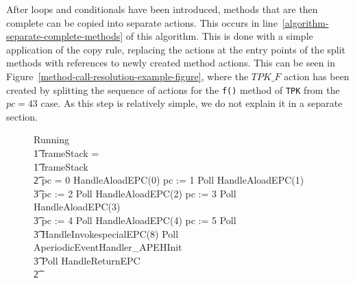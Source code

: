 After loops and conditionals have been introduced, methods that are
then complete can be copied into separate actions.
This occurs in line~\ref{algorithm-separate-complete-methods} of this
algorithm.
This is done with a simple application of the copy rule, replacing the
actions at the entry points of the split methods with references to
newly created method actions.
This can be seen in
Figure~\ref{method-call-resolution-example-figure}, where the $TPK\_F$
action has been created by splitting the sequence of actions for the
\texttt{f()} method of \texttt{TPK} from the $pc = 43$ case.
As this step is relatively simple, we do not explain it in a separate
section.
\begin{figure}[t]
  \setlength{\zedindent}{0cm}
  \setlength{\zedtab}{0.3cm}
  \setlength{\zedleftsep}{0cm}
  \begin{circus}
    Running \circdef \\
    \t1 \circif frameStack = \emptyset \circthen \Skip \\
    \t1 {} \circelse frameStack \neq \emptyset \circthen {} \\
    \t2 {} \circif pc = 0 \circthen HandleAloadEPC(0) \circseq pc := 1 \circseq Poll \circseq HandleAloadEPC(1) \circseq \\
    \t3 pc := 2 \circseq Poll \circseq HandleAloadEPC(2) \circseq pc := 3 \circseq Poll \circseq HandleAloadEPC(3) \circseq \\
    \t3 pc := 4 \circseq Poll \circseq HandleAloadEPC(4) \circseq pc := 5 \circseq Poll \circseq \\
    \t3 HandleInvokespecialEPC(8) \circseq Poll \circseq AperiodicEventHandler\_APEHInit \circseq \\
    \t3 Poll \circseq HandleReturnEPC \\
    \t2 {} \cdots {} \\

\end{circus}
\end{figure}
